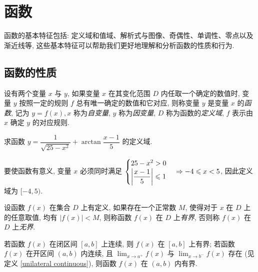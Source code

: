 \section{函数}

函数的基本特征包括: 定义域和值域、解析式与图像、奇偶性、单调性、零点以及渐近线等, 这些基本特征可以帮助我们更好地理解和分析函数的性质和行为.

\subsection{函数的性质}

\begin{definition}[函数的概念]
    设有两个变量 $ x $ 与 $ y $, 如果变量 $ x $ 在其变化范围 $ D $ 内任取一个确定的数值时, 变量 $ y $ 按照一定的规则 $ f $ 总有唯一确定的数值和它对应, 则称变量 $ y $ 是变量 $ x $ 的\textit{函数}, 记为 $ y=f(x), x $ 称为\textit{自变量}, $ y $ 称为\textit{因变量}, $ D $ 称为函数的\textit{定义域}, $ f $ 表示由 $ x $ 确定 $ y $ 的对应规则.
\end{definition}

\begin{example}
    求函数 $y=\dfrac{1}{\sqrt{25-x^2}}+\arctan\dfrac{x-1}{5}$ 的定义域.
\end{example}
\begin{solution}
    要使函数有意义, 变量 $x$ 必须同时满足 $\begin{cases}
            25-x^2>0 \\\qty|\dfrac{x-1}{5}|\leqslant 1
        \end{cases}\Rightarrow -4\leqslant x<5$, 因此定义域为 $[-4,5).$
\end{solution}

\begin{definition}[有界性]
    设函数 $ f(x) $ 在集合 $ D $ 上有定义, 如果存在一个正常数 $ M $, 使得对于 $ x$ 在 $ D $ 上的任意取值, 均有 $ |f(x)|<M $, 则称函数 $ f(x) $ 在 $ D $ 上\textit{有界}, 否则称 $ f(x) $ 在 $ D $ 上\textit{无界}.
\end{definition}

\begin{theorem}[闭区间函数的有界性]
    若函数 $f(x)$ 在闭区间 $[a,b]$ 上连续, 则 $f(x)$ 在 $[a,b]$ 上有界;
    若函数 $f(x)$ 在开区间 $(a,b)$ 内连续, 且 $\displaystyle\lim_{x\to a^+}f(x)$ 与 $\displaystyle\lim_{x\to b^-}f(x)$ 存在 (见定义 \ref{unilateral continuous}), 则函数 $f(x)$ 在 $(a,b)$ 内有界.
\end{theorem}


